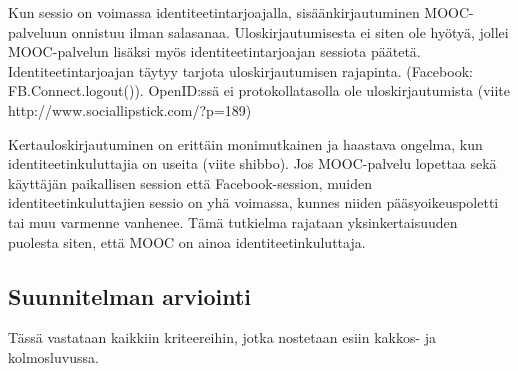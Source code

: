 \documentclass[finnish,gradu]{tktltiki}
\begin{document}
  Kun sessio on voimassa identiteetintarjoajalla, sisäänkirjautuminen MOOC-palveluun onnistuu ilman salasanaa. Uloskirjautumisesta ei siten ole hyötyä, jollei MOOC-palvelun lisäksi myös identiteetintarjoajan sessiota päätetä. Identiteetintarjoajan täytyy tarjota uloskirjautumisen rajapinta. (Facebook: FB.Connect.logout()). OpenID:ssä ei protokollatasolla ole uloskirjautumista (viite http://www.sociallipstick.com/?p=189)

  Kertauloskirjautuminen on erittäin monimutkainen ja haastava ongelma, kun identiteetinkuluttajia on useita (viite shibbo). Jos MOOC-palvelu lopettaa sekä käyttäjän paikallisen session että Facebook-session, muiden identiteetinkuluttajien sessio on yhä voimassa, kunnes niiden pääsyoikeuspoletti tai muu varmenne vanhenee. Tämä tutkielma rajataan yksinkertaisuuden puolesta siten, että MOOC on ainoa identiteetinkuluttaja.






  \subsection{Suunnitelman arviointi} %
  \label{sub:suunnitelman_arviointi}

  Tässä vastataan kaikkiin kriteereihin, jotka nostetaan esiin kakkos- ja kolmosluvussa.





\end{document}
